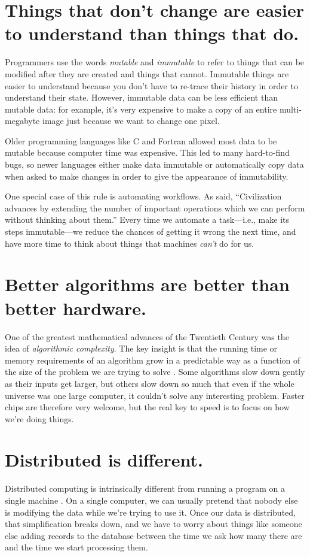 \documentclass[10pt,letterpaper]{article}
\newcommand{\rulemajor}[1]{\section{#1}}
\begin{document}
\rulemajor{Things that don't change are easier to understand than things that do.}

Programmers use the words \emph{mutable} and \emph{immutable} to refer to things
that can be modified after they are created and things that cannot.  Immutable
things are easier to understand because you don't have to re-trace their history
in order to understand their state.  However, immutable data can be less
efficient than mutable data: for example, it's very expensive to make a copy of
an entire multi-megabyte image just because we want to change one pixel.

Older programming languages like C and Fortran allowed most data to be mutable
because computer time was expensive.  This led to many hard-to-find bugs, so
newer languages either make data immutable or automatically copy data when asked
to make changes in order to give the appearance of immutability.

One special case of this rule is automating workflows.  As \cite{Whit1958} said,
``Civilization advances by extending the number of important operations which we
can perform without thinking about them.''  Every time we automate a
task---i.e., make its steps immutable---we reduce the chances of getting it
wrong the next time, and have more time to think about things that machines
\emph{can't} do for us.

\rulemajor{Better algorithms are better than better hardware.}

One of the greatest mathematical advances of the Twentieth Century was the idea
of \emph{algorithmic complexity}.  The key insight is that the running time or
memory requirements of an algorithm grow in a predictable way as a function of
the size of the problem we are trying to solve \cite{Cone2016}.  Some algorithms
slow down gently as their inputs get larger, but others slow down so much that
even if the whole universe was one large computer, it couldn't solve any
interesting problem.  Faster chips are therefore very welcome, but the real key
to speed is to focus on how we're doing things.

\rulemajor{Distributed is different.}

Distributed computing is intrinsically different from running a program on a
single machine \cite{Wald1994}.  On a single computer, we can usually pretend
that nobody else is modifying the data while we're trying to use it.  Once our
data is distributed, that simplification breaks down, and we have to worry about
things like someone else adding records to the database between the time we ask
how many there are and the time we start processing them.
\end{document}

